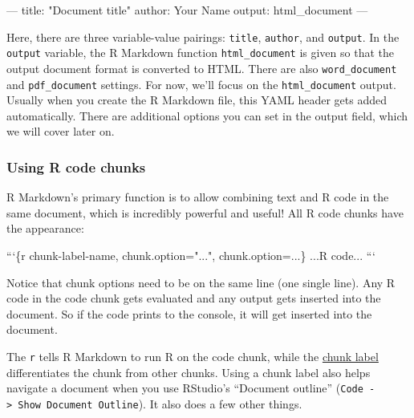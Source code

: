 \documentclass[]{Nemilov}
\newenvironment{Shaded}{\begin{snugshade}}{\end{snugshade}}
\newcommand{\AttributeTok}[1]{\textcolor[rgb]{0.77,0.63,0.00}{#1}}
\newcommand{\FunctionTok}[1]{\textcolor[rgb]{0.00,0.00,0.00}{#1}}
\newcommand{\NormalTok}[1]{#1}
\newcommand{\OtherTok}[1]{\textcolor[rgb]{0.56,0.35,0.01}{#1}}
\newcommand{\StringTok}[1]{\textcolor[rgb]{0.31,0.60,0.02}{#1}}
\begin{document}
\begin{Shaded}
\begin{Highlighting}[]
\OtherTok{---}
\FunctionTok{title:}\AttributeTok{ }\StringTok{"Document title"}
\FunctionTok{author:}\AttributeTok{ Your Name}
\FunctionTok{output:}\AttributeTok{ html_document}
\OtherTok{---}
\end{Highlighting}
\end{Shaded}

Here, there are three variable-value pairings: \texttt{title}, \texttt{author}, and \texttt{output}.
In the \texttt{output} variable, the R Markdown function \texttt{html\_document} is given so that
the output document format is converted to HTML. There are also \texttt{word\_document}
and \texttt{pdf\_document} settings. For now, we'll focus on the \texttt{html\_document} output.
Usually when you create the R Markdown file, this YAML header gets added
automatically. There are additional options you can set in the output field,
which we will cover later on.

\hypertarget{using-r-code-chunks}{%
\subsubsection{Using R code chunks}\label{using-r-code-chunks}}

R Markdown's primary function is to allow combining text and R code in the same
document, which is incredibly powerful and useful! All R code chunks have the
appearance:

\begin{Shaded}
\begin{Highlighting}[]
\NormalTok{```\{r chunk-label-name, chunk.option="...", chunk.option=...\}}
\NormalTok{...R code...}
\NormalTok{```}
\end{Highlighting}
\end{Shaded}

Notice that chunk options need to be on the same line (one single line). Any
R code in the code chunk gets evaluated and any output gets inserted into the
document. So if the code prints to the console, it will get inserted into the
document.

The \texttt{r} tells R Markdown to run R on the code chunk, while the \href{https://yihui.name/knitr/options/\#chunk-options}{chunk label}
differentiates the chunk from other chunks. Using a chunk label also helps navigate
a document when you use RStudio's ``Document outline'' (\texttt{Code\ -\textgreater{}\ Show\ Document\ Outline}).
It also does a few other things.
\end{document}
